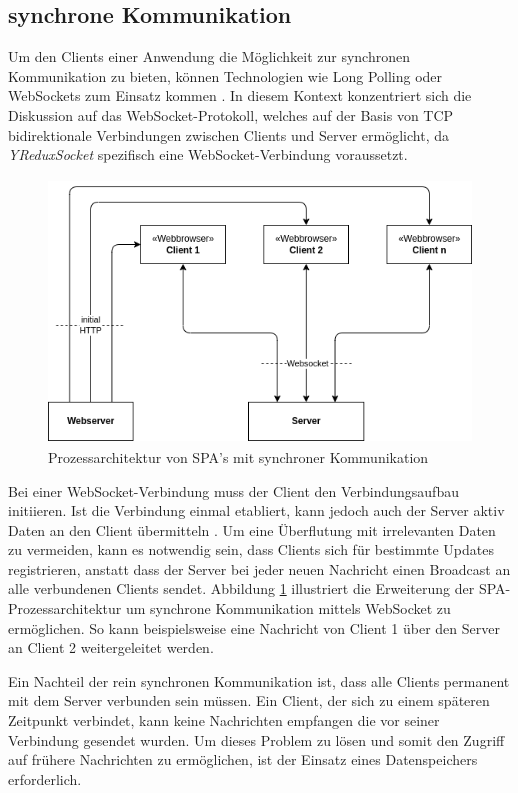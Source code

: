 \documentclass[12pt]{book}          %
\begin{document}
\subsection{synchrone Kommunikation}
\label{subsc-sync-comm}

Um den Clients einer Anwendung die Möglichkeit zur synchronen Kommunikation zu bieten, können Technologien wie Long Polling oder WebSockets zum Einsatz kommen \cite[182]{ackermann_webentwicklung_2021}. In diesem Kontext konzentriert sich die Diskussion auf das WebSocket-Protokoll, welches auf der Basis von TCP bidirektionale Verbindungen zwischen Clients und Server ermöglicht, da \textit{YReduxSocket} spezifisch eine WebSocket-Verbindung voraussetzt.


\begin{figure}[htbp]
\centering
\includegraphics[height=7cm]{abbildungen/spa/spa-sync-comm.png}
\caption{Prozessarchitektur von SPA's mit synchroner Kommunikation} 
\label{spa-sync-comm-architecture}
\end{figure}

Bei einer WebSocket-Verbindung muss der Client den Verbindungsaufbau initiieren. Ist die Verbindung einmal etabliert, kann jedoch auch der Server aktiv Daten an den Client übermitteln \cite[184-185]{ackermann_webentwicklung_2021}. Um eine Überflutung mit irrelevanten Daten zu vermeiden, kann es notwendig sein, dass Clients sich für bestimmte Updates registrieren, anstatt dass der Server bei jeder neuen Nachricht einen Broadcast an alle verbundenen Clients sendet. Abbildung \ref{spa-sync-comm-architecture} illustriert die Erweiterung der SPA-Prozessarchitektur um synchrone Kommunikation mittels WebSocket zu ermöglichen. So kann beispielsweise eine Nachricht von Client 1 über den Server an Client 2 weitergeleitet werden.

Ein Nachteil der rein synchronen Kommunikation ist, dass alle Clients permanent mit dem Server verbunden sein müssen. Ein Client, der sich zu einem späteren Zeitpunkt verbindet, kann keine Nachrichten empfangen die vor seiner Verbindung gesendet wurden. Um dieses Problem zu lösen und somit den Zugriff auf frühere Nachrichten zu ermöglichen, ist der Einsatz eines Datenspeichers erforderlich.
\end{document}
